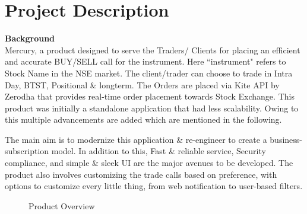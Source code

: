 \section{Project Description}
\textbf{Background}\\

Mercury, a product designed to serve the Traders/ Clients for placing an efficient and accurate BUY/SELL call for the instrument. 
Here ``instrument" refers to Stock Name in the NSE market. 
The client/trader can choose to trade in Intra Day, BTST, Positional \& longterm. 
The Orders are placed via Kite API by Zerodha that provides real-time order placement towards Stock Exchange.
This product was initially a standalone application that had less scalability. Owing to this multiple advancements are added which are mentioned in the following. 
\par
The main aim is to modernize this application \& re-engineer to create a business-subscription model. In addition to this, Fast \& reliable service, Security compliance, and simple \& sleek UI are the major avenues to be developed. The product also involves customizing the trade calls based on preference, with options to customize every little thing, from web notification to user-based filters.
\begin{figure}[ht]
\centering
{}
\caption{Product Overview}
\label{vmb}
\end{figure}


